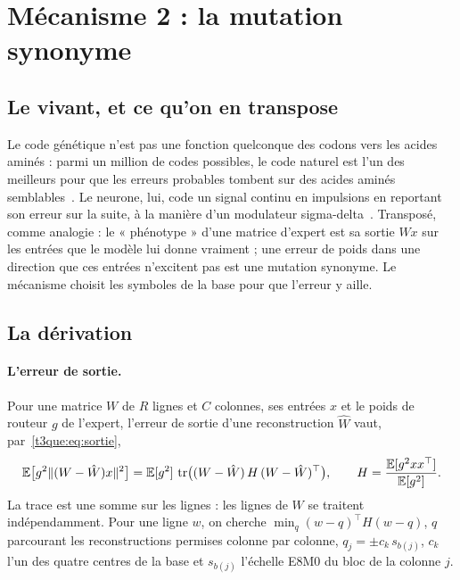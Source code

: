 \section{Mécanisme 2 : la mutation synonyme}\label{t3ecl:sec:mutation}

\subsection{Le vivant, et ce qu'on en transpose}

Le code génétique n'est pas une fonction quelconque des codons vers les acides aminés : parmi un million de codes possibles, le code naturel est l'un des meilleurs pour que les erreurs probables tombent sur des acides aminés semblables~\cite{freeland1998}. Le neurone, lui, code un signal continu en impulsions en reportant son erreur sur la suite, à la manière d'un modulateur sigma-delta~\cite{yoon2017sigmadelta}. Transposé, comme analogie : le « phénotype » d'une matrice d'expert est sa sortie $Wx$ sur les entrées que le modèle lui donne vraiment ; une erreur de poids dans une direction que ces entrées n'excitent pas est une mutation synonyme. Le mécanisme choisit les symboles de la base pour que l'erreur y aille.

\subsection{La dérivation}

\paragraph{L'erreur de sortie.} Pour une matrice $W$ de $R$ lignes et $C$ colonnes, ses entrées $x$ et le poids de routeur $g$ de l'expert, l'erreur de sortie d'une reconstruction $\hat W$ vaut, par~\eqref{t3que:eq:sortie},
\begin{equation}\label{t3ecl:eq:erreur}
\mathbb{E}\bigl[g^2 \|(W - \hat W) x\|^2\bigr] = \mathbb{E}[g^2]\ \mathrm{tr}\bigl((W - \hat W)\, H\, (W - \hat W)^\top\bigr), \qquad H = \frac{\mathbb{E}[g^2 x x^\top]}{\mathbb{E}[g^2]} .
\end{equation}
La trace est une somme sur les lignes : les lignes de $W$ se traitent indépendamment. Pour une ligne $w$, on cherche $\min_q (w - q)^\top H (w - q)$, $q$ parcourant les reconstructions permises colonne par colonne, $q_j = \pm c_k\, s_{b(j)}$, $c_k$ l'un des quatre centres de la base et $s_{b(j)}$ l'échelle E8M0 du bloc de la colonne $j$.

